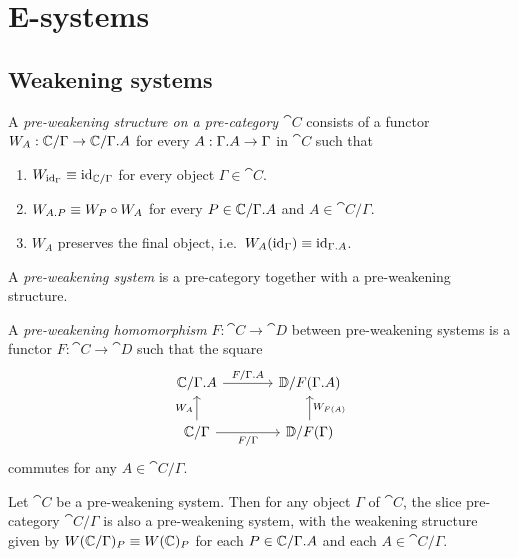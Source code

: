 \section{E-systems}\label{sec:esys_defn}

\subsection{Weakening systems}

\begin{defn}
A \emph{pre-weakening structure on a pre-category $\cat{C}$} consists of a functor
$W_A:\cat{C}/\Gamma\to \cat{C}/\ctxext{\Gamma}{A}$ for every $A:\ctxext{\Gamma}{A}\to \Gamma$ in $\cat{C}$ such 
that
\begin{enumerate}
\item $W_{{\mathrm{id}_{\Gamma}}}\equiv {\mathrm{id}_{\mathbb{C}/\Gamma}}$ for every object $\Gamma\in\cat{C}$.
\item $W_{\ctxext{A}{P}}\jdeq W_P\circ W_A$ for every $P\in\cat{C}/\ctxext{\Gamma}{A}$ and $A\in\cat{C}/\Gamma$.
\item $W_A$ preserves the final object, i.e.~$W_A(\catid{\Gamma})\jdeq \catid{\ctxext{\Gamma}{A}}$.
\end{enumerate}
A \emph{pre-weakening system} is a pre-category together with a pre-weakening structure.
\end{defn}

\begin{defn}
A \emph{pre-weakening homomorphism} $F:\cat{C}\to\cat{D}$ between pre-weakening systems
is a functor $F:\cat{C}\to\cat{D}$ such that the square
\begin{equation*}
\begin{tikzcd}[column sep=large]
\cat{C}/\ctxext{\Gamma}{A}
  \arrow[r,"F/\ctxext{\Gamma}{A}"]
  &
\cat{D}/F(\ctxext{\Gamma}{A})
  \\
\cat{C}/\Gamma
  \arrow[u,"W_A"]
  \arrow[r,swap,"F/\Gamma"]
  &
\cat{D}/F(\Gamma)
  \arrow[u,swap,"W_{F(A)}"]
\end{tikzcd}
\end{equation*}
commutes for any $A\in\cat{C}/\Gamma$.
\end{defn}

\begin{lem}
Let $\cat{C}$ be a pre-weakening system. Then for any object $\Gamma$ of $\cat{C}$,
the slice pre-category $\cat{C}/\Gamma$ is also a pre-weakening system, with the weakening
structure given by $W(\mathbb{C}/\Gamma)_P\equiv W(\mathbb{C})_P$ for each $P\in\cat{C}/\ctxext{\Gamma}{A}$
and each $A\in\cat{C}/\Gamma$.
\end{lem}

